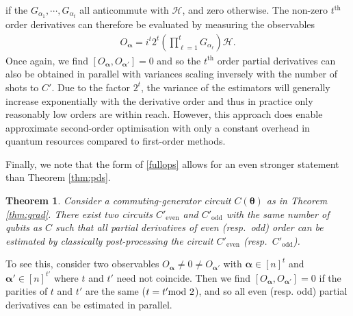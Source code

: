 \documentclass[a4paper,twocolumn,11pt]{quantumarticle}
\newtheorem{theorem}{Theorem}
\renewcommand{\vec}{\boldsymbol}
\newcommand{\nospacemod}{\hspace{-7pt}\mod}
\begin{document}
%
if the $G_{\alpha_1},\cdots,G_{\alpha_t}$ all anticommute with $\mathcal{H}$, and zero otherwise. The non-zero $t^{\text{th}}$ order derivatives can therefore be evaluated by measuring the observables 
\begin{align}\label{fullops}
O_{\vec{\alpha}}=i^{t}2^t\left(\prod_{\ell=1}^t G_{\alpha_\ell}\right)\mathcal{H}.
\end{align} 
%
Once again, we find $[O_{\vec{\alpha}},O_{\vec{\alpha}'}]=0$ and so the $t^{\text{th}}$ order partial derivatives can also be obtained in parallel with variances scaling inversely with the number of shots to $C'$. Due to the factor $2^t$, the variance of the estimators will generally increase exponentially with the derivative order and thus in practice only reasonably low orders are within reach. However, this approach does enable approximate second-order optimisation with only a constant overhead in quantum resources compared to first-order methods.

Finally, we note that the form of \eqref{fullops} allows for an even stronger statement than Theorem \ref{thm:pds}.
%
\begin{theorem}
Consider a commuting-generator circuit $C(\vec{\theta})$ as in Theorem \ref{thm:grad}. There exist two circuits ${C}'_{\text{even}}$ and ${C}'_\text{odd}$ with the same number of qubits as $C$ such that all partial derivatives of even (resp.\ odd) order can be estimated by classically post-processing the circuit ${C}'_{\text{even}}$ (resp.\ ${C}'_{\text{odd}}$).
\end{theorem}
%
To see this, consider two observables $O_{\vec{\alpha}}\neq 0\neq O_{\vec{\alpha}'}$ with $\vec{\alpha}\in[n]^t$ and $\vec{\alpha}'\in[n]^{t'}$ where $t$ and $t'$ need not coincide.
Then we find $[O_{\vec{\alpha}},O_{\vec{\alpha}'}]=0$ if the parities of $t$ and $t'$ are the same ($t=t' \nospacemod 2$), and so all even (resp. odd) partial derivatives can be estimated in parallel.
\end{document}

